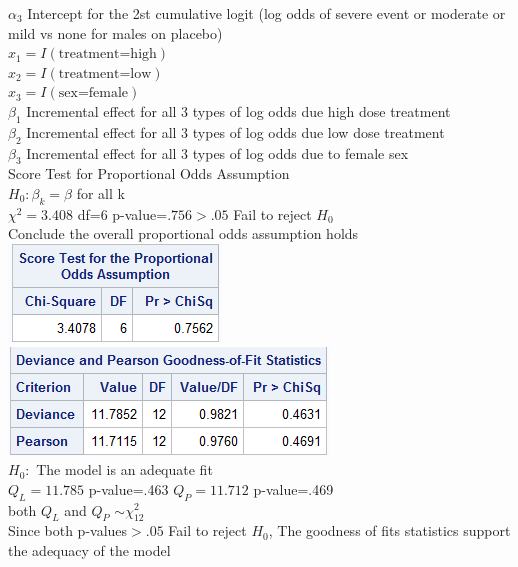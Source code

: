\documentclass{article}
\begin{document}
\begin{flushleft}
$\alpha_3$ Intercept for the 2st cumulative logit (log odds of severe event or moderate or mild vs none for males on placebo)\\
$x_1=I(\text{treatment=high})$\\
$x_2=I(\text{treatment=low})$\\
$x_3=I(\text{sex=female})$\\
$\beta_1$ Incremental effect for all 3 types of log odds due high dose treatment\\
$\beta_2$ Incremental effect for all 3 types of log odds due low dose treatment\\
$\beta_3$ Incremental effect for all 3 types of log odds due to female sex\\
Score Test for Proportional Odds Assumption\\
$H_0: \beta_k=\beta$ for all k\\
$\chi^2=3.408$ df=6 p-value=$.756>.05$ Fail to reject $H_0$\\
Conclude the overall proportional odds assumption holds\\
\includegraphics[scale=.6]{stpo.png}
\includegraphics[scale=.6]{gofprop.png}\\
$H_0:$ The model is an adequate fit\\
$Q_L=11.785$ p-value=.463 $Q_P=11.712$ p-value=.469\\
both $ Q_L$ and $Q_P$ $\sim \chi^2_{12}$\\
Since both p-values$>.05$ Fail to reject $H_0$, The goodness of fits statistics support the adequacy of the model
\pagebreak

\end{flushleft}
\end{document}
